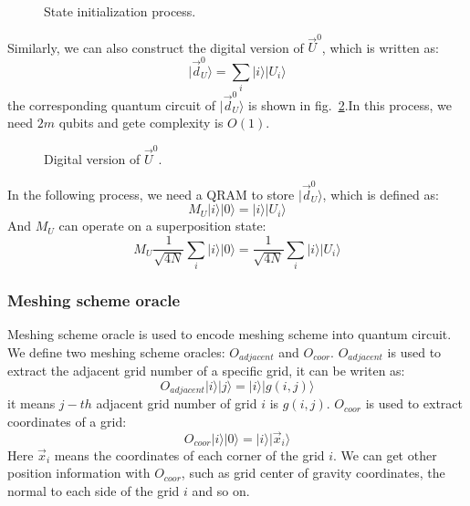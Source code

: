 \documentclass[%
 reprint,
 amsmath,amssymb,
pra,
]{revtex4-1}
\begin{document}
\begin{figure}[htbp]
    \caption{State initialization process.  }
    \label{state_initialization}
\end{figure}
Similarly, we can also construct the digital version of $\vec{U}^0$, which is written as:
$$
|\vec{d}_U^0\rangle=\sum_i{|i\rangle|U_i\rangle}
$$
the corresponding quantum circuit of $|\vec{d}_U^0\rangle$ is shown in fig.~\ref{digit_state_initialization}.In this process, we need $2m$ qubits and gete complexity is $O(1)$.

\begin{figure}[htbp]
    \caption{Digital version of $\vec{U}^0$. }
    \label{digit_state_initialization}
\end{figure}

In the following process, we need a QRAM to store $|\vec{d}_U^0\rangle$, which is defined as:
$$
M_U|i\rangle|0\rangle=|i\rangle|U_i\rangle
$$
And $M_U$ can operate on a superposition state:
$$
M_U\frac{1}{\sqrt{4N}}\sum_i{|i\rangle|0\rangle}=\frac{1}{\sqrt{4N}}\sum_i{|i\rangle|U_i\rangle}
$$

\subsubsection{Meshing scheme oracle}

Meshing scheme oracle is used to encode meshing scheme into quantum circuit. We define two meshing scheme oracles: $O_{adjacent}$ and $O_{coor}$. $O_{adjacent}$ is used to extract the adjacent grid number of a specific grid, it can be writen as:
$$
O_{adjacent}|i\rangle|j\rangle=|i\rangle|g(i,j)\rangle
$$
it means $j-th$ adjacent grid number of grid $i$ is $g(i,j)$. $O_{coor}$ is used to extract coordinates of a grid:
$$
O_{coor}|i\rangle|0\rangle=|i\rangle|\vec{x}_i\rangle
$$
Here $\vec{x}_i$ means the coordinates of each corner of the grid $i$. We can get other position information with $O_{coor}$, such as grid center of gravity coordinates, the normal to each side of the grid $i$ and so on.
\end{document}
